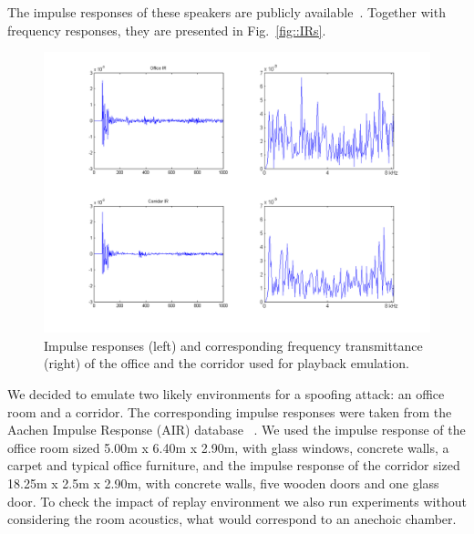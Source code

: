 The impulse responses of these speakers are publicly available~\cite{Brown2014}. Together with frequency responses, they are presented in Fig.~\ref{fig::IRs}.



\begin{figure}
	\centering
	\includegraphics[width=1\linewidth]{Figs/Room_IRs.png}
	\caption{Impulse responses (left) and corresponding frequency transmittance (right) of the office and the corridor used for playback emulation.}
	\label{fig::Room_IRs}
\end{figure}

We decided to emulate two likely environments for a spoofing attack: an office room and a corridor. The corresponding impulse responses were taken from the Aachen Impulse Response (AIR) database ~\cite{Jeub2009}. We used the impulse response of the office room sized 5.00m x 6.40m x 2.90m, with glass windows, concrete walls, a carpet and typical office furniture, and the impulse response of the corridor sized 18.25m x 2.5m x 2.90m, with concrete walls, five wooden doors and one glass door. To check the impact of replay environment we also run experiments without considering the room acoustics, what would correspond to an anechoic chamber.


